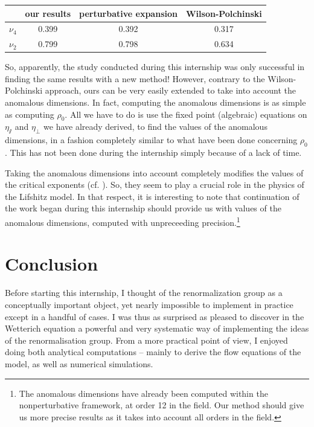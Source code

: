 \begin{center}
\label{tab:results}
\begin{tabular}{|c|c|c|c|}
\hline 
\rule[-1ex]{0pt}{2.5ex} ~ & our results & perturbative expansion & Wilson-Polchinski \\ 
\hline 
\rule[-1ex]{0pt}{2.5ex} $\nu_4$ & 0.399 & 0.392 & 0.317 \\ 
\hline 
\rule[-1ex]{0pt}{2.5ex} $\nu_2$ & 0.799 & 0.798 & 0.634 \\ 
\hline 
\end{tabular} 
\end{center}

So, apparently, the study conducted during this internship was only successful in finding the same results with a new method!
However, contrary to the Wilson-Polchinski approach, ours can be very easily extended to take into account the anomalous dimensions. In fact, computing the anomalous dimensions is as simple as computing $\rho_0$. All we have to do is use the fixed point (algebraic) equations on $\eta_\sslash$ and $\eta_\perp$ we have already derived, to find the values of the anomalous dimensions, in a fashion completely similar to what have been done concerning $\rho_0$. This has not been done during the internship simply because of a lack of time.

Taking the anomalous dimensions into account completely modifies the values of the critical exponents (cf. \cite{MouhannaLif}). So, they seem to play a crucial role in the physics of the Lifshitz model. 
In that respect, it is interesting to note that continuation of the work began during this internship should provide us with values of the anomalous dimensions, computed with unpreceeding precision.\footnote{The anomalous dimensions have already been computed within the nonperturbative framework, at order 12 in the field. Our method should give us more precise results as it takes into account all orders in the field.}


\section*{\huge{Conclusion}}

Before starting this internship, I thought of the renormalization group as a conceptually important object, yet nearly impossible to implement in practice except in a handful of cases. 
I was thus as surprised as pleased to discover in the Wetterich equation a powerful and very systematic way of implementing the ideas of the renormalisation group. 
From a more practical point of view, I enjoyed doing both analytical computations -- mainly to derive the flow equations of the model, as well as numerical simulations.


